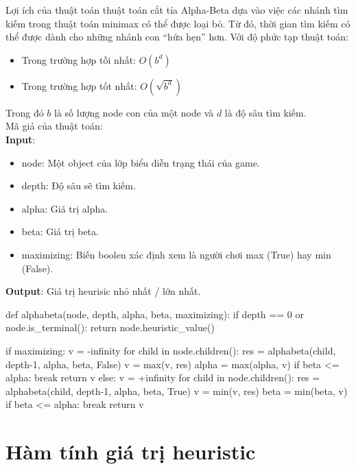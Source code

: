 \documentclass[12pt]{report}
\begin{document}
Lợi ích của thuật toán thuật toán cắt tỉa Alpha-Beta dựa vào việc các nhánh tìm kiếm trong thuật toán minimax có thể được 
loại bỏ. Từ đó, thời gian tìm kiếm có thể được dành cho những nhánh con ``hứa hẹn'' hơn. Với độ phức tạp thuật toán: 
\begin{itemize}
    \item Trong trường hợp tồi nhất: $O(b^d)$
    \item Trong trường hợp tốt nhất: $O(\sqrt{b^d})$
\end{itemize}
Trong đó $b$ là số lượng node con của một node và $d$ là độ sâu tìm kiếm. \\[0.5cm]

\noindent
Mã giả của thuật toán: \\
\textbf{Input}:
\begin{itemize}
    \item node: Một object của lớp biểu diễn trạng thái của game. 
    \item depth: Độ sâu sẽ tìm kiếm. 
    \item alpha: Giá trị alpha. 
    \item beta: Giá trị beta. 
    \item maximizing: Biến boolen xác định xem là người chơi max (True) hay min (False). 
\end{itemize}
\textbf{Output}: Giá trị heurisic nhỏ nhất / lớn nhất. \\[0.5cm]
\begin{python}
def alphabeta(node, depth, alpha, beta, maximizing):
    if depth == 0 or node.is_terminal():
        return node.heuristic_value()

    if maximizing:
        v = -infinity
        for child in node.children():
            res = alphabeta(child, depth-1, alpha, beta, False)
            v = max(v, res)
            alpha = max(alpha, v)
            if beta <= alpha: 
                break 
        return v
    else:
        v = +infinity
        for child in node.children():
            res = alphabeta(child, depth-1, alpha, beta, True)
            v = min(v, res)
            beta = min(beta, v)
            if beta <= alpha:
                break
        return v
\end{python}

\section{Hàm tính giá trị heuristic}
\end{document}
